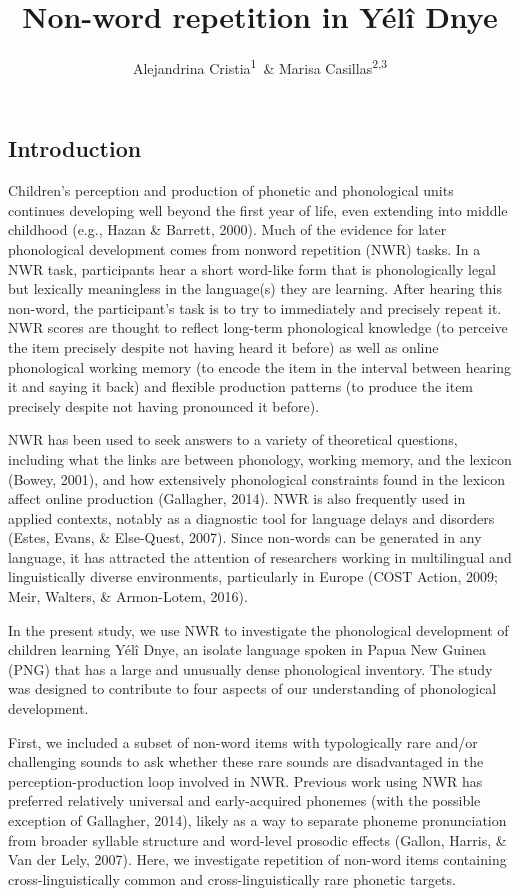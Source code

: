 \documentclass[english,,man,floatsintext]{apa6}
\author{Alejandrina Cristia\textsuperscript{1}\ \& Marisa Casillas\textsuperscript{2,3}}
\affiliation{
\vspace{0.5cm}
\textsuperscript{1} Laboratoire de Sciences Cognitives et de Psycholinguistique, Département d'Etudes cognitives, ENS, EHESS, CNRS, PSL University\\\textsuperscript{2} Max Planck Institute for Psycholinguistics\\\textsuperscript{3} University of Chicago}
\title{Non-word repetition in Yélî Dnye}
\date{}
\begin{document}
\maketitle

\hypertarget{introduction}{%
\subsection{Introduction}\label{introduction}}

Children's perception and production of phonetic and phonological units continues developing well beyond the first year of life, even extending into middle childhood (e.g., Hazan \& Barrett, 2000). Much of the evidence for later phonological development comes from nonword repetition (NWR) tasks. In a NWR task, participants hear a short word-like form that is phonologically legal but lexically meaningless in the language(s) they are learning. After hearing this non-word, the participant's task is to try to immediately and precisely repeat it. NWR scores are thought to reflect long-term phonological knowledge (to perceive the item precisely despite not having heard it before) as well as online phonological working memory (to encode the item in the interval between hearing it and saying it back) and flexible production patterns (to produce the item precisely despite not having pronounced it before).

NWR has been used to seek answers to a variety of theoretical questions, including what the links are between phonology, working memory, and the lexicon (Bowey, 2001), and how extensively phonological constraints found in the lexicon affect online production (Gallagher, 2014). NWR is also frequently used in applied contexts, notably as a diagnostic tool for language delays and disorders (Estes, Evans, \& Else-Quest, 2007). Since non-words can be generated in any language, it has attracted the attention of researchers working in multilingual and linguistically diverse environments, particularly in Europe (COST Action, 2009; Meir, Walters, \& Armon-Lotem, 2016).

In the present study, we use NWR to investigate the phonological development of children learning Yélî Dnye, an isolate language spoken in Papua New Guinea (PNG) that has a large and unusually dense phonological inventory. The study was designed to contribute to four aspects of our understanding of phonological development.

First, we included a subset of non-word items with typologically rare and/or challenging sounds to ask whether these rare sounds are disadvantaged in the perception-production loop involved in NWR. Previous work using NWR has preferred relatively universal and early-acquired phonemes (with the possible exception of Gallagher, 2014), likely as a way to separate phoneme pronunciation from broader syllable structure and word-level prosodic effects (Gallon, Harris, \& Van der Lely, 2007). Here, we investigate repetition of non-word items containing cross-linguistically common and cross-linguistically rare phonetic targets.
\end{document}

